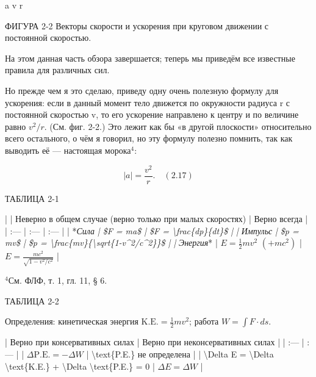 \documentclass[10pt,oneside]{article}
\newcommand{\TipsRunning}[1]{\par\vspace{2bp}{\centering\footnotesize #1\par}\vspace{2bp}}
\newcommand{\TipsSubsection}[1]{\par\vspace{6bp}{\normalsize\bfseries #1\par}\vspace{2bp}}
\begin{document}
a v r\par

ФИГУРА 2-2 Векторы скорости и ускорения при круговом движении с постоянной скоростью.\par

На этом данная часть обзора завершается; теперь мы приведём все известные правила для различных сил.\par

Но прежде чем я это сделаю, приведу одну очень полезную формулу для ускорения: если в данный момент тело движется по окружности радиуса r с постоянной скоростью v, то его ускорение направлено к центру и по величине равно \(v^2/r\). (См. фиг. 2-2.) Это лежит как бы «в другой плоскости» относительно всего остального, о чём я говорил, но эту формулу полезно помнить, так как выводить её --- настоящая морока\(^4\):\par

\[|a| = \frac{v^2}{r}. \quad(2.17)\]\par

ТАБЛИЦА 2-1\par

| | Неверно в общем случае (верно только при малых скоростях) | Верно всегда | | :--- | :--- | :--- | | *\emph{Сила}\emph{ | \$F = ma\$ | \$F = \textbackslash{}frac\{dp\}\{dt\}\$ | | }\emph{Импульс}\emph{ | \$p = mv\$ | \$p = \textbackslash{}frac\{mv\}\{\textbackslash{}sqrt\{1-v\textasciicircum{}2/c\textasciicircum{}2\}\}\$ | | }\emph{Энергия}* | \(E = \frac{1}{2}mv^2\) \((+ mc^2)\) | \(E = \frac{mc^2}{\sqrt{1-v^2/c^2}}\) |\par

\(^4\)См. ФЛФ, т. 1, гл. 11, § 6.\par

\TipsRunning{З А К О Н Ы  И  И Н Т У И Ц И Я • 6 7}

ТАБЛИЦА 2-2\par

Определения: кинетическая энергия \(\text{K.E.} = \frac{1}{2}mv^2\); работа \(W = \int F \cdot ds\).\par

| Верно при консервативных силах | Верно при неконсервативных силах | | :--- | :--- | | \(\Delta \text{P.E.} = -\Delta W\) | \textbackslash{}text\{P.E.\} не определена | | \textbackslash{}Delta E = \textbackslash{}Delta \textbackslash{}text\{K.E.\} + \textbackslash{}Delta \textbackslash{}text\{P.E.\} = 0 | \(\Delta E = \Delta W\) |\par

\TipsSubsection{2-4 Силы и их потенциалы}
\end{document}
